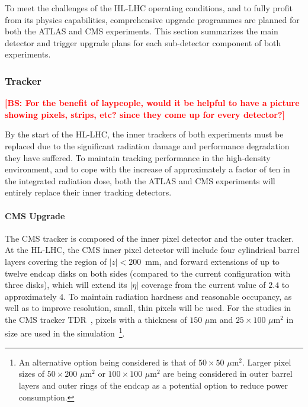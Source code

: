 To meet the challenges of the HL-LHC operating conditions, and to fully profit from its physics capabilities, comprehensive upgrade programmes are planned for both the ATLAS and CMS experiments. This section summarizes the main detector and trigger upgrade plans for each sub-detector component of both experiments. 

\subsubsection{Tracker} \label{sec:upgradetracker}

{\bf \textcolor{red}{[BS: For the benefit of laypeople, would it be helpful to have a picture showing pixels, strips, etc? since they come up for every detector?]}}

By the start of the HL-LHC, the inner trackers of both experiments must be replaced due to the significant radiation damage and performance degradation they have suffered. To maintain tracking performance in the high-density environment, and to cope with the increase of approximately a factor of ten in the integrated radiation dose, both the ATLAS and CMS experiments will entirely replace their inner tracking detectors.  

\paragraph{CMS Upgrade} 
The CMS tracker is composed of the inner pixel detector and the outer tracker. At the HL-LHC, the CMS inner pixel detector will include four cylindrical barrel layers covering the region of $|z| < 200$~mm, and forward extensions of up to twelve endcap disks on both sides (compared to the current configuration with three disks), which will extend its $|\eta|$ coverage from the current value of $2.4$ to approximately $4$. To maintain radiation hardness and reasonable occupancy, as well as to improve resolution, small, thin pixels will be used. For the studies in the CMS tracker TDR~\cite{Collaboration:2272264}, pixels with a thickness of $150\,\, \mu \mathrm{m}$ and $25\times100\,\,{\mu \mathrm{m}}^2$ in size are used in the simulation~\footnote{An alternative option being considered is that of $50\times50\,\,{\mu \mathrm{m}}^2$. Larger pixel sizes of $50\times200\,\,{\mu \mathrm{m}}^2$ or $100\times100\,\,{\mu \mathrm{m}}^2$ are being considered in outer barrel layers and outer rings of the endcap as a potential option to reduce power consumption.}.

